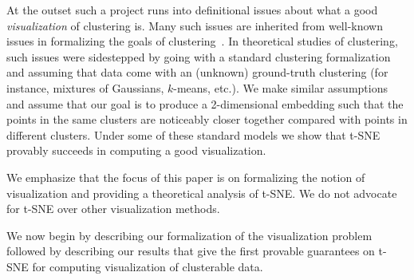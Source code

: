 At the outset such a project runs into definitional issues about what a good {\em visualization} of clustering is. Many such issues are inherited from well-known issues in formalizing the goals of clustering~\citep{conf/nips/Kleinberg02}. In theoretical studies of clustering, such issues were sidestepped by going with a standard clustering formalization and assuming that data come with an (unknown) ground-truth clustering (for instance, mixtures of Gaussians, $k$-means, etc.). We make similar assumptions and assume that our goal is to produce a 2-dimensional embedding such that the points in the same clusters are noticeably closer together compared with points in different clusters. Under some of these standard models we show that t-SNE provably succeeds in computing a good visualization.  



We emphasize that the focus of this paper is on formalizing the notion of visualization and providing a theoretical analysis of t-SNE. We do not advocate for t-SNE over other visualization methods.

We now begin by describing our formalization of the visualization problem followed by describing our results that give the first provable guarantees on t-SNE for computing visualization of clusterable data. 





